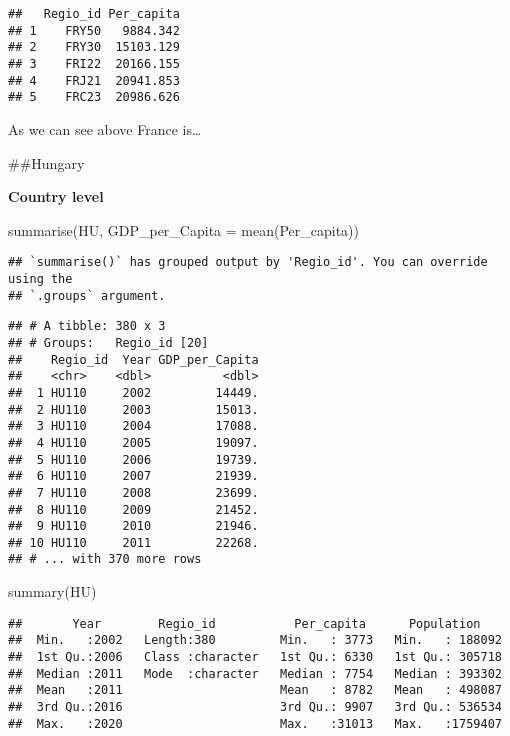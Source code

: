 \documentclass[
]{article}
\newenvironment{Shaded}{\begin{snugshade}}{\end{snugshade}}
\newcommand{\AttributeTok}[1]{\textcolor[rgb]{0.77,0.63,0.00}{#1}}
\newcommand{\FunctionTok}[1]{\textcolor[rgb]{0.00,0.00,0.00}{#1}}
\newcommand{\NormalTok}[1]{#1}
\begin{document}
\begin{verbatim}
##   Regio_id Per_capita
## 1    FRY50   9884.342
## 2    FRY30  15103.129
## 3    FRI22  20166.155
## 4    FRJ21  20941.853
## 5    FRC23  20986.626
\end{verbatim}

As we can see above France is\ldots{}

\#\#Hungary

\textbf{Country level}

\begin{Shaded}
\begin{Highlighting}[]
    \FunctionTok{summarise}\NormalTok{(HU, }\AttributeTok{GDP\_per\_Capita =} \FunctionTok{mean}\NormalTok{(Per\_capita))}
\end{Highlighting}
\end{Shaded}

\begin{verbatim}
## `summarise()` has grouped output by 'Regio_id'. You can override using the
## `.groups` argument.
\end{verbatim}

\begin{verbatim}
## # A tibble: 380 x 3
## # Groups:   Regio_id [20]
##    Regio_id  Year GDP_per_Capita
##    <chr>    <dbl>          <dbl>
##  1 HU110     2002         14449.
##  2 HU110     2003         15013.
##  3 HU110     2004         17088.
##  4 HU110     2005         19097.
##  5 HU110     2006         19739.
##  6 HU110     2007         21939.
##  7 HU110     2008         23699.
##  8 HU110     2009         21452.
##  9 HU110     2010         21946.
## 10 HU110     2011         22268.
## # ... with 370 more rows
\end{verbatim}

\begin{Shaded}
\begin{Highlighting}[]
\FunctionTok{summary}\NormalTok{(HU)}
\end{Highlighting}
\end{Shaded}

\begin{verbatim}
##       Year        Regio_id           Per_capita      Population     
##  Min.   :2002   Length:380         Min.   : 3773   Min.   : 188092  
##  1st Qu.:2006   Class :character   1st Qu.: 6330   1st Qu.: 305718  
##  Median :2011   Mode  :character   Median : 7754   Median : 393302  
##  Mean   :2011                      Mean   : 8782   Mean   : 498087  
##  3rd Qu.:2016                      3rd Qu.: 9907   3rd Qu.: 536534  
##  Max.   :2020                      Max.   :31013   Max.   :1759407
\end{verbatim}
\end{document}
